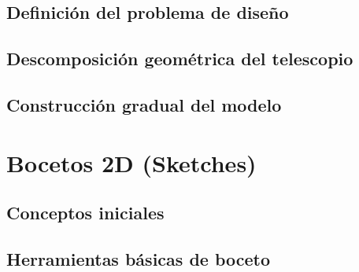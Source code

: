 \subsection{Definición del problema de diseño}

\subsection{Descomposición geométrica del telescopio}

\subsection{Construcción gradual del modelo}

\section{Bocetos 2D (Sketches)}

\subsection{Conceptos iniciales}

\subsection{Herramientas básicas de boceto}

